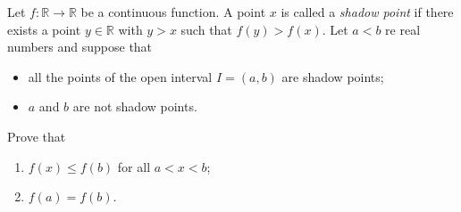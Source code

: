 \documentclass{article}
\begin{document}
\setlength{\parindent}{0pt}
Let $f:\mathbb{R}\to\mathbb{R}$ be a continuous function. A point $x$ is called a \emph{shadow point} if there exists a point $y\in\mathbb{R}$ with $y>x$ such that $f(y)>f(x)$. Let $a<b$ re real numbers and suppose that
\begin{itemize}
	\item all the points of the open interval $I=(a,b)$ are shadow points;
	\item $a$ and $b$ are not shadow points.
\end{itemize}
Prove that
\begin{enumerate}[label=\alph*)]
\item $f(x)\le f(b)$ for all $a<x<b$;
\item $f(a)=f(b)$.
\end{enumerate}
\end{document}
